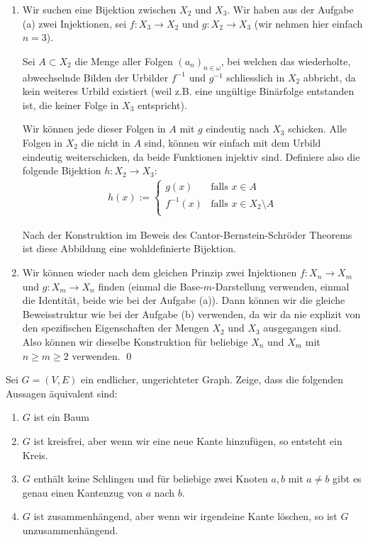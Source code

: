 \documentclass[12pt]{article}
\begin{document}
\begin{enumerate}[label=\alph*)]
    Da $|X_2|$ einfach irgendeine Kardinalzahl ist, gilt, dass alle $X_n$ dieselbe Kardinalität besitzen.

    \item Wir suchen eine Bijektion zwischen $X_2$ und $X_3$. Wir haben aus der Aufgabe (a) zwei Injektionen, sei $f: X_3 \rightarrow X_2$ und $g: X_2 \rightarrow X_3$ (wir nehmen hier einfach $n = 3$).
    
    Sei $A \subset X_2$ die Menge aller Folgen $(a_n)_{n \in \omega}$, bei welchen das wiederholte, abwechselnde Bilden der Urbilder $f^{-1}$ und $g^{-1}$ schliesslich in $X_2$ abbricht, da kein weiteres Urbild existiert (weil z.B. eine ungültige Binärfolge entstanden ist, die keiner Folge in $X_3$ entspricht).

    Wir können jede dieser Folgen in $A$ mit $g$ eindeutig nach $X_3$ schicken. Alle Folgen in $X_2$ die nicht in $A$ sind, können wir einfach mit dem Urbild eindeutig weiterschicken, da beide Funktionen injektiv sind. Definiere also die folgende Bijektion $h: X_2 \rightarrow X_3$:
    \begin{align*}
        h(x) := 
        \begin{cases}
            g(x) & \text{falls }x \in A \\
            f^{-1}(x) & \text{falls }x \in X_2 \setminus A \\
        \end{cases}
    \end{align*}

    Nach der Konstruktion im Beweis des Cantor-Bernstein-Schröder Theorems ist diese Abbildung eine wohldefinierte Bijektion.

    \item Wir können wieder nach dem gleichen Prinzip zwei Injektionen $f: X_n \rightarrow X_m$ und $g: X_m \rightarrow X_n$ finden (einmal die Base-$m$-Darstellung verwenden, einmal die Identität, beide wie bei der Aufgabe (a)). Dann können wir die gleiche Beweisstruktur wie bei der Aufgabe (b) verwenden, da wir da nie explizit von den spezifischen Eigenschaften der Mengen $X_2$ und $X_3$ ausgegangen sind. Also können wir dieselbe Konstruktion für beliebige $X_n$ und $X_m$ mit $n \geq m \geq 2$ verwenden. \qed
\end{enumerate}

\newpage

\begin{problem}{}{}
    Sei $G = (V, E)$ ein endlicher, ungerichteter Graph. Zeige, dass die folgenden Aussagen äquivalent sind:
    \begin{enumerate}[label=\alph*)]
        \item $G$ ist ein Baum
        \item $G$ ist kreisfrei, aber wenn wir eine neue Kante hinzufügen, so entsteht ein Kreis.
        \item $G$ enthält keine Schlingen und für beliebige zwei Knoten $a, b$ mit $a \neq b$ gibt es genau einen Kantenzug von $a$ nach $b$.
        \item $G$ ist zusammenhängend, aber wenn wir irgendeine Kante löschen, so ist $G$ unzusammenhängend.
    \end{enumerate}
\end{problem}
\end{document}
